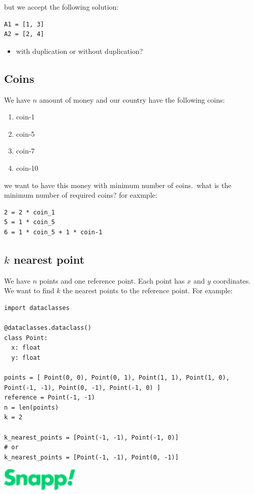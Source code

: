 \documentclass[]{article}
\begin{document}
but we accept the following solution:

\begin{verbatim}
A1 = [1, 3]
A2 = [2, 4]
\end{verbatim}

\begin{itemize}
  \item with duplication or without duplication?
\end{itemize}

\subsection{Coins}

We have $n$ amount of money and our country have the following coins:

\begin{enumerate}
  \item coin-1
  \item coin-5
  \item coin-7
  \item coin-10
\end{enumerate}

we want to have this money with minimum number of coins.\ what is the minimum number of required coins?
for eaxmple:

\begin{verbatim}
2 = 2 * coin_1
5 = 1 * coin_5
6 = 1 * coin_5 + 1 * coin-1
\end{verbatim}

\subsection{$k$ nearest point}

We have $n$ points and one reference point.
Each point has $x$ and $y$ coordinates.
We want to find $k$ the nearest points to the reference point.
For example:

\begin{verbatim}
import dataclasses

@dataclasses.dataclass()
class Point:
  x: float
  y: float

points = [ Point(0, 0), Point(0, 1), Point(1, 1), Point(1, 0), Point(-1, -1), Point(0, -1), Point(-1, 0) ]
reference = Point(-1, -1)
n = len(points)
k = 2

k_nearest_points = [Point(-1, -1), Point(-1, 0)]
# or
k_nearest_points = [Point(-1, -1), Point(0, -1)]
\end{verbatim}


\vspace{\fill}
\includegraphics[width=10em]{./snapp.png}
\end{document}
